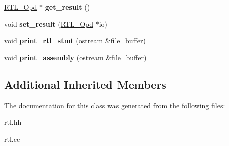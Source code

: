 \begin{DoxyCompactItemize}
\hyperlink{classRTL__Opd}{R\+T\+L\+\_\+\+Opd} $\ast$ {\bfseries get\+\_\+result} ()
\item 
\mbox{\label{classCompute__RTL__Stmt_a1fa7508ac3fd34bfd1341cce15e3a199}} 
void {\bfseries set\+\_\+result} (\hyperlink{classRTL__Opd}{R\+T\+L\+\_\+\+Opd} $\ast$io)
\item 
\mbox{\label{classCompute__RTL__Stmt_aac7caa0b0d6b8f46ef1b605154bb1b16}} 
void {\bfseries print\+\_\+rtl\+\_\+stmt} (ostream \&file\+\_\+buffer)
\item 
\mbox{\label{classCompute__RTL__Stmt_ad10729ddf06d2ddf5beadd7e1ee2d888}} 
void {\bfseries print\+\_\+assembly} (ostream \&file\+\_\+buffer)
\end{DoxyCompactItemize}
\subsection*{Additional Inherited Members}


The documentation for this class was generated from the following files\+:\begin{DoxyCompactItemize}
\item 
rtl.\+hh\item 
rtl.\+cc\end{DoxyCompactItemize}
